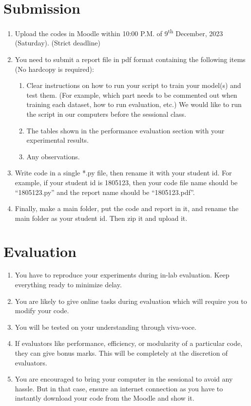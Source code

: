 \documentclass[11pt, a4paper]{article}
\begin{document}
\section{Submission}
\begin{enumerate}
    \item Upload the codes in Moodle within 10:00 P.M. of 9\textsuperscript{th} December, 2023 (Saturday). (Strict deadline)
    \item You need to submit a report file in pdf format containing the following items (No hardcopy is required):
    \begin{enumerate}
        \item Clear instructions on how to run your script to train your model(s) and test them. (For example, which part needs to be commented out when training each dataset, how to run evaluation, etc.) We would like to run the script in our computers before the sessional class.
        \item The tables shown in the performance evaluation section with your experimental results.
        \item Any observations.
    \end{enumerate}
    \item Write code in a single *.py file, then rename it with your student id. For example, if your student id is 1805123, then your code file name should be ``1805123.py'' and the report name should be ``1805123.pdf''.
    \item Finally, make a main folder, put the code and report in it, and rename the main folder as your student id. Then zip it and upload it.
\end{enumerate}

\section{Evaluation}
\begin{enumerate}
    \item You have to reproduce your experiments during in-lab evaluation. Keep everything ready to minimize delay.
    \item You are likely to give online tasks during evaluation which will require you to modify your code.
    \item You will be tested on your understanding through viva-voce.
    \item If evaluators like performance, efficiency, or modularity of a particular code, they can give bonus marks. This will be completely at the discretion of evaluators.
    \item You are encouraged to bring your computer in the sessional to avoid any hassle. But in that case, ensure an internet connection as you have to instantly download your code from the Moodle and show it.
\end{enumerate}
\end{document}
